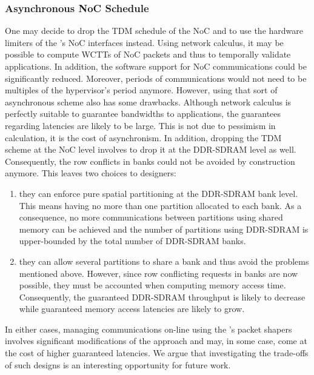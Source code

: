 \documentclass[main.tex]{subfiles}
\begin{document}
\subsubsection{Asynchronous NoC Schedule} One may decide to drop the TDM
schedule of the NoC and to use the hardware limiters of the \mppalong's NoC
interfaces instead. Using network calculus, it may be possible to compute WCTTs
of NoC packets and thus to temporally validate applications. In addition, the
software support for NoC communications could be significantly reduced.
Moreover, periods of communications would not need to be multiples of the
hypervisor's period anymore. However, using that sort of asynchronous scheme
also has some drawbacks. Although network calculus is perfectly suitable to
guarantee bandwidths to applications, the guarantees regarding latencies are
likely to be large. This is not due to pessimism in calculation, it is the cost
of asynchronism. In addition, dropping the TDM scheme at the NoC level involves
to drop it at the DDR-SDRAM level as well. Consequently, the row conflicts in
banks could not be avoided by construction anymore. This leaves two choices to
designers: 
\begin{enumerate} 
    \item they can enforce pure spatial partitioning at the
        DDR-SDRAM bank level. This means having no more than one partition
            allocated to each bank. As a consequence, no more communications
            between partitions using shared memory can be achieved and the
        number of partitions using DDR-SDRAM is upper-bounded by the total
        number of DDR-SDRAM banks.  
    \item they can allow several partitions to
        share a bank and thus avoid the problems mentioned above. However,
        since row conflicting requests in banks are now possible, they must be
        accounted when computing memory access time. Consequently, the
        guaranteed DDR-SDRAM throughput is likely to decrease while guaranteed
        memory access latencies are likely to grow.  
\end{enumerate} 
In either cases, managing communications on-line using the \mppalong's packet
shapers involves significant modifications of the approach and may, in some
case, come at the cost of higher guaranteed latencies. We argue that
investigating the trade-offs of such designs is an interesting opportunity for
future work.
\end{document}

